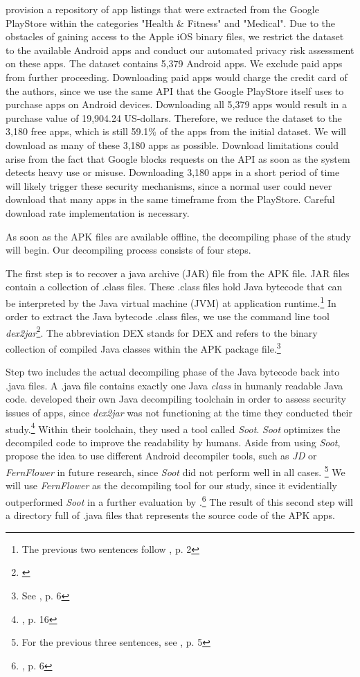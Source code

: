 \documentclass[
	a4paper,
	oneside,
	12pt,
	liststotocnumbered
]{article}
\let\cite\textcite
\begin{document}
\cite{Xu2015} provision a repository of app listings that were extracted from the Google PlayStore within the categories "Health \& Fitness" and "Medical".
Due to the obstacles of gaining access to the Apple iOS binary files, we restrict the dataset to the available Android apps and conduct our automated privacy risk assessment on these apps.
The \cite{Xu2015} dataset contains 5,379 Android apps. 
We exclude paid apps from further proceeding. Downloading paid apps would charge the credit card of the authors, since we use the same \acs{API} that the Google PlayStore itself uses to purchase apps on Android devices. 
Downloading all 5,379 apps would result in a purchase value of 19,904.24 US-dollars. 
Therefore, we reduce the dataset to the 3,180 free apps, which is still 59.1\% of the apps from the initial dataset. 
We will download as many of these 3,180 apps as possible.
Download limitations could arise from the fact that Google blocks requests on the API as soon as the system detects heavy use or misuse. 
Downloading 3,180 apps in a short period of time will likely trigger these security mechanisms, since a normal user could never download that many apps in the same timeframe from the PlayStore.
Careful download rate implementation is necessary.

As soon as the \acs{APK} files are available offline, the decompiling phase of the study will begin.
Our decompiling process consists of four steps.

The first step is to recover a java archive (\acs{JAR}) file from the \acs{APK} file.
\acs{JAR} files contain a collection of .class files. 
These .class files hold Java bytecode that can be interpreted by the Java virtual machine (\acs{JVM}) at application runtime.\footnote{The previous two sentences follow \cite{Enck2011}, p. 2} 
In order to extract the Java bytecode .class files, we use the command line tool \textit{dex2jar}\footnote{\cite{Pan2010}}. 
The abbreviation \acs{DEX} stands for \acl{DEX} and refers to the binary collection of compiled Java classes within the \acs{APK} package file.\footnote{See \cite{xu2013}, p. 6}

Step two includes the actual decompiling phase of the Java bytecode back into .java files. 
A .java file contains exactly one Java \textit{class} in humanly readable Java code. 
\cite{Enck2011} developed their own Java decompiling toolchain in order to assess security issues of \mH apps, since \textit{dex2jar} was not functioning at the time they conducted their study.\footnote{\cite{Enck2011}, p. 16}
Within their toolchain, they used a tool called \textit{Soot}.
\textit{Soot} optimizes the decompiled code to improve the readability by humans.
Aside from using \textit{Soot}, \cite{Enck2011} propose the idea to use different Android decompiler tools, such as \textit{JD} or \textit{FernFlower} in future research, since \textit{Soot} did not perform well in all cases. \footnote{For the previous three sentences, see \cite{Enck2011}, p. 5}
We will use \textit{FernFlower} as the decompiling tool for our study, since it evidentially outperformed \textit{Soot} in a further evaluation by \cite{Enck2011}.\footnote{\cite{Enck2011}, p. 6}
The result of this second step will a directory full of .java files that represents the source code of the \acs{APK} apps.
\end{document}
